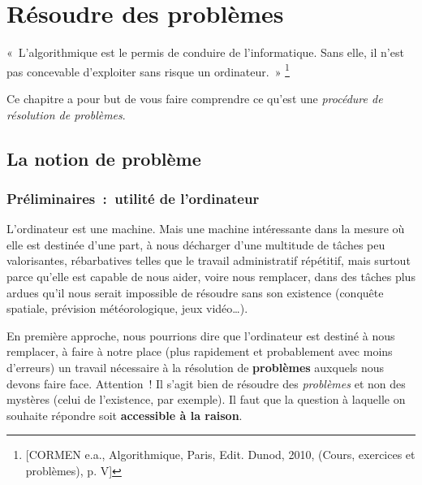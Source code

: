 \chapter{Résoudre des problèmes}

	\begin{Exergue}
		«~L’algorithmique est le permis de conduire de l’informatique.
		Sans elle, il n’est pas concevable d’exploiter sans risque un ordinateur.~»
		\footnote{[CORMEN e.a., Algorithmique, Paris, Edit. Dunod, 2010, (Cours, 
		exercices et problèmes), p. V] }
	\end{Exergue}

	Ce chapitre a pour but
	de vous faire comprendre ce qu’est une 
	\emph{procédure de résolution de problèmes}.

	\section{La notion de problème}
	
		\subsection{Préliminaires~:~utilité de l’ordinateur}
		
			L’ordinateur est une machine. 
			Mais une machine intéressante dans la mesure 
			où elle est destinée d’une part, 
			à nous décharger d’une multitude de tâches peu valorisantes, 
			rébarbatives telles que le travail administratif répétitif, 
			mais surtout parce qu’elle est capable de nous aider, 
			voire nous remplacer, dans des tâches plus ardues 
			qu’il nous serait impossible de résoudre sans son existence 
			(conquête spatiale, prévision météorologique, jeux vidéo\dots).
			
			En première approche, 
			nous pourrions dire que l’ordinateur 
			est destiné à nous remplacer, 
			à faire à notre place 
			(plus rapidement et probablement avec moins d’erreurs) 
			un travail nécessaire à la résolution de \textbf{problèmes} 
			auxquels nous devons faire face. 
			Attention~! Il s’agit bien de résoudre des \textit{problèmes} 
			et non des mystères (celui de l’existence, par exemple). 
			Il faut que la question à laquelle
			on souhaite répondre soit \textbf{accessible à la raison}.
	
